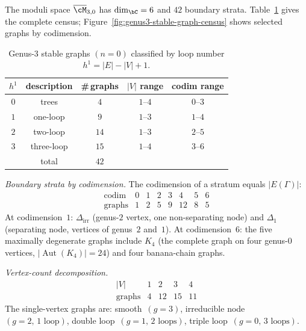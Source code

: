 \begin{computation}
\label{comp:vol1-genus-three-stable-graph-census}
The moduli space $\overline{\cM}_{3,0}$ has $\dim_\bC = 6$
and $42$ boundary strata.
Table~\ref{tab:genus3-graphs} gives the complete census;
Figure~\ref{fig:genus3-stable-graph-census} shows
selected graphs by codimension.
\begin{table}[ht]
\centering
\renewcommand{\arraystretch}{1.3}
\begin{tabular}{ccccc}
$h^1$ & description & \#\,graphs & $|V|$ range
& codim range \\
\hline
$0$ & trees & $4$ & $1$--$4$ & $0$--$3$ \\
$1$ & one-loop & $9$ & $1$--$3$ & $1$--$4$ \\
$2$ & two-loop & $14$ & $1$--$3$ & $2$--$5$ \\
$3$ & three-loop & $15$ & $1$--$4$ & $3$--$6$ \\
\hline
& total & $42$ & &
\end{tabular}
\caption{Genus-$3$ stable graphs $(n=0)$ classified by loop
number $h^1 = |E| - |V| + 1$.}\label{tab:genus3-graphs}
\end{table}

\noindent
\emph{Boundary strata by codimension.}
The codimension of a stratum equals $|E(\Gamma)|$:
\begin{equation}\label{eq:genus3-boundary-codim}
\begin{array}{c|ccccccc}
\operatorname{codim} & 0 & 1 & 2 & 3 & 4 & 5 & 6 \\
\hline
\text{graphs} & 1 & 2 & 5 & 9 & 12 & 8 & 5
\end{array}
\end{equation}
At codimension~$1$: $\Delta_{\mathrm{irr}}$ (genus-$2$ vertex, one
non-separating node) and $\Delta_1$ (separating node, vertices of
genus~$2$ and~$1$).
At codimension~$6$: the five maximally degenerate graphs include
$K_4$ (the complete graph on four genus-$0$ vertices,
$|\operatorname{Aut}(K_4)| = 24$) and four banana-chain graphs.

\smallskip\noindent
\emph{Vertex-count decomposition.}
\begin{equation}\label{eq:genus3-by-vertices}
\begin{array}{c|cccc}
|V| & 1 & 2 & 3 & 4 \\
\hline
\text{graphs} & 4 & 12 & 15 & 11
\end{array}
\end{equation}
The single-vertex graphs are: smooth~$(g{=}3)$,
irreducible node~$(g{=}2,\,1\text{ loop})$,
double loop~$(g{=}1,\,2\text{ loops})$,
triple loop~$(g{=}0,\,3\text{ loops})$.


\end{computation}
